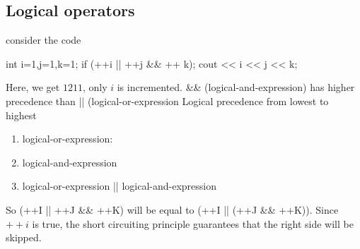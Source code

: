\documentclass{report}
\begin{document}
\pagebreak 
{}
\bigbreak \noindent 
\subsection{Logical operators}
\bigbreak \noindent 
consider the code
\bigbreak \noindent 
\begin{cppcode}
int i=1,j=1,k=1;
if (++i || ++j && ++ k);
cout << i << j << k;
\end{cppcode}
\bigbreak \noindent 
Here, we get $1211$, only $i$ is incremented. \&\& (logical-and-expression) has higher precedence than || (logical-or-expression
\bigbreak \noindent 
Logical precedence from lowest to highest
\begin{enumerate}
    \item logical-or-expression:
    \item logical-and-expression
    \item logical-or-expression || logical-and-expression
\end{enumerate}
\bigbreak \noindent 
So (++I || ++J \&\& ++K) will be equal to (++I || (++J \&\& ++K)). Since $++i$ is true, the short circuiting principle guarantees that the right side will be skipped.































    





    
\end{document}
